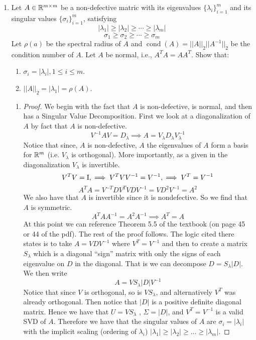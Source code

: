 \documentclass{article}
\DeclareMathOperator{\cond}{cond}
\begin{document}
\begin{enumerate}
\begin{proof}
\end{proof}

\item %
Let $A \in \mathbb{R}^{m\times m}$ be a non-defective matric with its eigenvalues $\{\lambda_i\}_{i=1}^m$ and its singular values $\{\sigma_i\}_{i=1}^m$, satisfying
\[
    |\lambda_1| \ge |\lambda_2| \ge \cdots \ge |\lambda_m|
\]
\[
    \sigma_1 \ge \sigma_2 \ge \cdots \ge \sigma_m
\]
Let $\rho(a)$ be the spectral radius of $A$ and $\cond(A) = ||A||_2||A^{-1}||_2$ be the condition number of $A$. Let $A$ be normal, i.e., $A^TA = AA^T$. Show that: 
\begin{enumerate}
\item $\sigma_i = |\lambda_i|, 1 \le i \le m$.

\item $||A||_2 = |\lambda_1| = \rho(A)$. 
\end{enumerate}

\begin{enumerate}

\item 
\begin{proof}
    We begin with the fact that $A$ is non-defective, is normal, and then has a Singular Value Decomposition. First we look at a diagonalization of $A$ by fact that $A$ is non-defective. 
    \[
        V^{-1}AV = D_{\lambda} \implies A = V_{\lambda}D_{\lambda}V_{\lambda}^{-1}
    \]
    Notice that since, $A$ is non-defective, $A$ the eigenvalues of $A$ form a basis for $\mathbb{R}^m$ (i.e. $V_{\lambda}$ is orthogonal). More importantly, as a given in the diagonalization $V_{\lambda}$ is invertible. 
    \[ 
        V^TV = \mathrm{I}, \implies  V^TVV^{-1} = V^{-1}, \implies  V^T = V^{-1}
    \]
    \[
        A^TA = V^{-T}DV^TVDV^{-1} = VD^2V^{-1} = A^2
    \]
    We also have that $A$ is invertible since it is nondefective. So we find that $A$ is symmetric. 
    \[
        A^TAA^{-1} = A^2A^{-1} \implies A^T = A
    \]
    At this point we can reference Theorem 5.5 of the textbook (on page 45 or 44 of the pdf). The rest of the proof follows. The logic cited there states is to take $A = VDV^{-1}$ where $V^T = V^{-1}$ and then to create a matrix $S_{\lambda}$ which is a diagonal  ``sign'' matrix with only the signs of each eigenvalue on $D$ in the diagonal. That is we can decompose $D = S_{\lambda}|D|$. We then write
    \[
        A = VS_{\lambda}|D|V^{-1}
    \]
    Notice that since $V$ is orthogonal, so is $VS_{\lambda}$, and alternatively $V^T$ was already orthogonal. Then notice that $|D|$ is a positive definite diagonal matrix. Hence we have that $U = VS_{\lambda}$ , $\Sigma = |D|$, and $V^T = V^{-1}$ is a valid SVD of $A$. Therefore we have that the singular values of $A$ are $\sigma_i = |\lambda_i|$ with the implicit scaling (ordering of $\lambda_i$) $|\lambda_1| \ge |\lambda_2| \ge \dotsc \ge |\lambda_m|$.


\end{proof}
\end{enumerate}
\end{enumerate}
\end{document}
